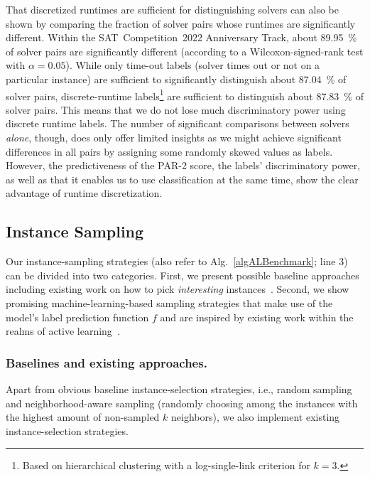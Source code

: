 \documentclass[runningheads]{llncs}
\begin{document}
That discretized runtimes are sufficient for distinguishing solvers can also be shown by comparing the fraction of solver pairs whose runtimes are significantly different.
Within the SAT~Competition~2022 Anniversary Track, about \SI{89.95}{\%} of solver pairs are significantly different (according to a Wilcoxon-signed-rank test with $\alpha = 0.05$).
While only time-out labels (solver times out or not on a particular instance) are sufficient to significantly distinguish about \SI{87.04}{\%} of solver pairs, discrete-runtime labels\footnote{Based on hierarchical clustering with a log-single-link criterion for $k = 3$.} are sufficient to distinguish about \SI{87.83}{\%} of solver pairs.
This means that we do not lose much discriminatory power using discrete runtime labels.
The number of significant comparisons between solvers \textit{alone}, though, does only offer limited insights as we might achieve significant differences in all pairs by assigning some randomly skewed values as labels.
However, the predictiveness of the PAR-2 score, the labels' discriminatory power, as well as that it enables us to use classification at the same time, show the clear advantage of runtime discretization.


\subsection{Instance Sampling}
\label{sec:main2}
Our instance-sampling strategies (also refer to Alg.~\ref{algALBenchmark}; line 3) can be divided into two categories.
First, we present possible baseline approaches including existing work on how to pick \textit{interesting} instances~\cite{Bossek021a,GentHJKMNN14,MatriconAFSH21}.
Second, we show promising machine-learning-based sampling strategies that make use of the model's label prediction function $f$ and are inspired by existing work within the realms of active learning~\cite{settles2009active}.

\subsubsection{Baselines and existing approaches.}
\label{sec:sampling1}
Apart from obvious baseline instance-selection strategies, i.e., random sampling and neighborhood-aware sampling (randomly choosing among the instances with the highest amount of non-sampled $k$ neighbors), we also implement existing instance-selection strategies.
\end{document}
